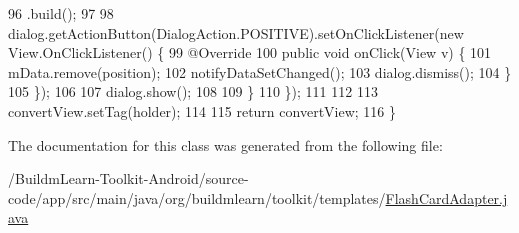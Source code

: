 \begin{DoxyCode}
96                         .build();
97 
98                 dialog.getActionButton(DialogAction.POSITIVE).setOnClickListener(\textcolor{keyword}{new} View.OnClickListener()
       \{
99                     @Override
100                     \textcolor{keyword}{public} \textcolor{keywordtype}{void} onClick(View v) \{
101                         mData.remove(position);
102                         notifyDataSetChanged();
103                         dialog.dismiss();
104                     \}
105                 \});
106 
107                 dialog.show();
108 
109             \}
110         \});
111 
112 
113         convertView.setTag(holder);
114 
115         \textcolor{keywordflow}{return} convertView;
116     \}
\end{DoxyCode}


The documentation for this class was generated from the following file\-:\begin{DoxyCompactItemize}
\item 
/\-Buildm\-Learn-\/\-Toolkit-\/\-Android/source-\/code/app/src/main/java/org/buildmlearn/toolkit/templates/\hyperlink{FlashCardAdapter_8java}{Flash\-Card\-Adapter.\-java}\end{DoxyCompactItemize}
